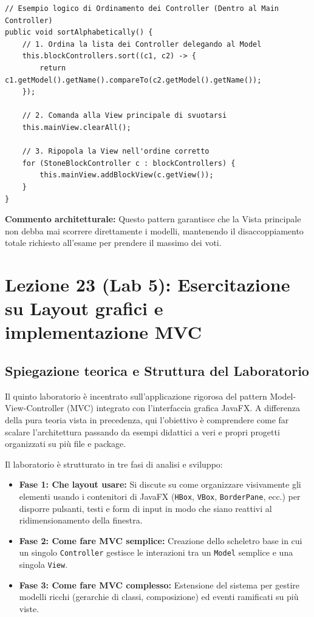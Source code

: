 \documentclass[12pt, a4paper]{article}
\begin{document}
\begin{verbatim}
// Esempio logico di Ordinamento dei Controller (Dentro al Main Controller)
public void sortAlphabetically() {
    // 1. Ordina la lista dei Controller delegando al Model
    this.blockControllers.sort((c1, c2) -> {
        return c1.getModel().getName().compareTo(c2.getModel().getName());
    });

    // 2. Comanda alla View principale di svuotarsi
    this.mainView.clearAll();

    // 3. Ripopola la View nell'ordine corretto
    for (StoneBlockController c : blockControllers) {
        this.mainView.addBlockView(c.getView());
    }
}
\end{verbatim}
\textbf{Commento architetturale:} Questo pattern garantisce che la Vista principale non debba mai scorrere direttamente i modelli, mantenendo il disaccoppiamento totale richiesto all'esame per prendere il massimo dei voti.

\newpage

\section{Lezione 23 (Lab 5): Esercitazione su Layout grafici e implementazione MVC}

\subsection{Spiegazione teorica e Struttura del Laboratorio}
Il quinto laboratorio è incentrato sull'applicazione rigorosa del pattern Model-View-Controller (MVC) integrato con l'interfaccia grafica JavaFX. A differenza della pura teoria vista in precedenza, qui l'obiettivo è comprendere come far scalare l'architettura passando da esempi didattici a veri e propri progetti organizzati su più file e package.

Il laboratorio è strutturato in tre fasi di analisi e sviluppo:
\begin{itemize}
    \item \textbf{Fase 1: Che layout usare:} Si discute su come organizzare visivamente gli elementi usando i contenitori di JavaFX (\texttt{HBox}, \texttt{VBox}, \texttt{BorderPane}, ecc.) per disporre pulsanti, testi e form di input in modo che siano reattivi al ridimensionamento della finestra.
    \item \textbf{Fase 2: Come fare MVC semplice:} Creazione dello scheletro base in cui un singolo \texttt{Controller} gestisce le interazioni tra un \texttt{Model} semplice e una singola \texttt{View}.
    \item \textbf{Fase 3: Come fare MVC complesso:} Estensione del sistema per gestire modelli ricchi (gerarchie di classi, composizione) ed eventi ramificati su più viste.
\end{itemize}
\end{document}
